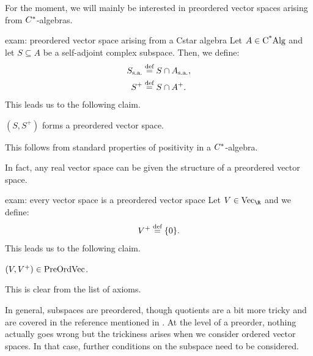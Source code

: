 \documentclass[main.tex]{subfiles}
\begin{document}
For the moment, we will mainly be interested in preordered vector spaces arising from ${C}^{*}$-algebras. 

\begin{example}{}{exam: preordered vector space arising from a Cstar algebra}
Let $A \in \operatorname{C^{*}Alg}$ and let $S \subseteq A$ be a self-adjoint complex subspace. Then, we define:
\begin{align*}
S_{\text{s.a.}} &\stackrel{\text{def}}{=} S \cap A_{\text{s.a.}},\\ 
S^+ &\stackrel{\text{def}}{=} S \cap A^+.
\end{align*} 
This leads us to the following claim. 
\begin{claim}
$(S,S^+)$ forms a preordered vector space. 
\end{claim} 
This follows from standard properties of positivity in a ${C}^{*}$-algebra.  
\end{example}

In fact, any real vector space can be given the structure of a preordered vector space. 

\begin{example}{}{exam: every vector space is a preordered vector space} 
Let $V \in \Vect{\R}$ and we define:
\[V^+ \stackrel{\text{def}}{=} \{0\}.\] 
This leads us to the following claim. 
\begin{claim}
$(V,V^+) \in \text{PreOrdVec}$.
\end{claim}
This is clear from the list of axioms. 
\end{example}

In general, subspaces are preordered, though quotients are a bit more tricky and are covered in the reference mentioned in . At the level of a preorder, nothing actually goes wrong but the trickiness arises when we consider ordered vector spaces. In that case, further conditions on the subspace need to be considered. 
\end{document}
